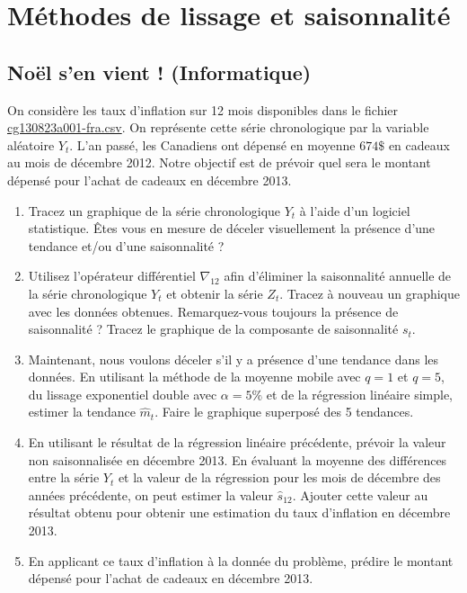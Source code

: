 \documentclass[11pt,english,francais]{article}
\begin{document}
\section{Méthodes de lissage et saisonnalité}
\label{sec:serie-dexercices-1}

\subsection{Noël s'en vient ! (Informatique)}
\label{sec:exercice-1-1}

On considère les taux d'inflation sur 12 mois disponibles dans le
fichier \url{cg130823a001-fra.csv}. On représente cette série chronologique
par la variable aléatoire $Y_t$. L'an passé, les Canadiens ont dépensé
en moyenne $674\$$ en cadeaux au mois de décembre 2012. Notre objectif
est de prévoir quel sera le montant dépensé pour l'achat de cadeaux en
décembre 2013.

\begin{enumerate}
\item Tracez un graphique de la série chronologique $Y_t$ à l'aide
  d'un logiciel statistique. Êtes vous en mesure de déceler
  visuellement la présence d'une tendance et/ou d'une saisonnalité ?

\item Utilisez l'opérateur différentiel $\nabla_{12}$ afin d'éliminer
  la saisonnalité annuelle de la série chronologique $Y_t$ et obtenir
  la série $Z_t$. Tracez à nouveau un graphique avec les données
  obtenues. Remarquez-vous toujours la présence de saisonnalité ?
  Tracez le graphique de la composante de saisonnalité $s_t$.

\item Maintenant, nous voulons déceler s'il y a présence d'une
  tendance dans les données. En utilisant la méthode de la moyenne
  mobile avec $q=1$ et $q=5$, du lissage exponentiel double avec
  $\alpha=5\%$ et de la régression linéaire simple, estimer la
  tendance $\hat{m}_t$. Faire le graphique superposé des 5 tendances.

\item En utilisant le résultat de la régression linéaire précédente,
  prévoir la valeur non saisonnalisée en décembre 2013. En évaluant la
  moyenne des différences entre la série $Y_t$ et la valeur de la
  régression pour les mois de décembre des années précédente, on peut
  estimer la valeur $\hat{s}_{12}$. Ajouter cette valeur au résultat
  obtenu pour obtenir une estimation du taux d'inflation en décembre
  2013.

\item En applicant ce taux d'inflation à la donnée du problème,
  prédire le montant dépensé pour l'achat de cadeaux en décembre 2013.
\end{enumerate}
\end{document}
